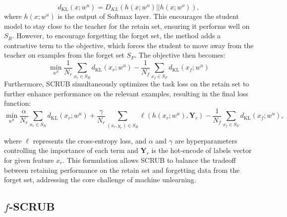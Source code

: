 \documentclass{article} %
\begin{document}
\[
d_{\mathrm{KL}}(x; w^u) = D_{KL}(h(x; w^u) || h(x; w^o)),
\]
where $h(x; w^u)$ is the output of Softmax layer.
This encourages the student model to stay close to the teacher for the retain set, ensuring it performs well on $S_R$. However, to encourage forgetting the forget set, the method adds a contrastive term to the objective, which forces the student to move away from the teacher on examples from the forget set $S_F$. The objective then becomes:
\[
\min_{w^u} \frac{1}{N_r} \sum_{x_r \in S_R} d_{\mathrm{KL}}(x_r; w^u) - \frac{1}{N_f} \sum_{x_f \in S_F} d_{\mathrm{KL}}(x_f; w^u)
\]
Furthermore, SCRUB simultaneously optimizes the task loss on the retain set to further enhance performance on the relevant examples, resulting in the final loss function:
\[
\min_{w^u} \frac{\alpha}{N_r} \sum_{x_r \in S_R} d_{\mathrm{KL}}(x_r; w^u) + \frac{\gamma}{N_r} \sum_{(x_r, y_r) \in S_R} \ell(h(x_r; w^u), \mathbf{Y}_r) - \frac{1}{N_f} \sum_{x_f \in S_F} d_{\mathrm{KL}}(x_f; w^u),
\]

where $\ell$ represents the cross-entropy loss, and $\alpha$ and $\gamma$ are hyperparameters controlling the importance of each term and $\mathbf{Y}_r$ is the hot-encode of labels vector for given feature $x_r$. This formulation allows SCRUB to balance the tradeoff between retaining performance on the retain set and forgetting data from the forget set, addressing the core challenge of machine unlearning.

\subsection{ \texorpdfstring{$f$}{f}-SCRUB}
\end{document}
